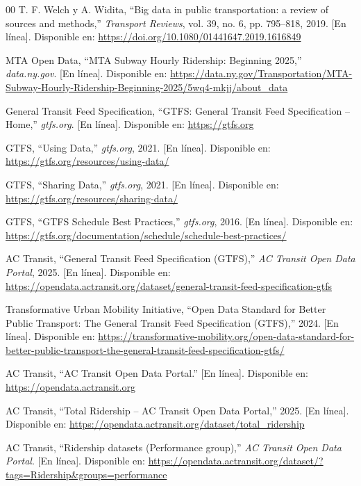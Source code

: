 \documentclass[preprint,12pt]{elsarticle}
\begin{document}
\begin{thebibliography}{00}
T. F. Welch y A. Widita, ``Big data in public transportation: a review of sources and methods,'' \textit{Transport Reviews}, vol. 39, no. 6, pp. 795--818, 2019. [En línea]. Disponible en: \url{https://doi.org/10.1080/01441647.2019.1616849}

MTA Open Data, ``MTA Subway Hourly Ridership: Beginning 2025,'' \textit{data.ny.gov}. [En línea]. Disponible en: \url{https://data.ny.gov/Transportation/MTA-Subway-Hourly-Ridership-Beginning-2025/5wq4-mkjj/about_data}

General Transit Feed Specification, ``GTFS: General Transit Feed Specification -- Home,'' \textit{gtfs.org}. [En línea]. Disponible en: \url{https://gtfs.org}

GTFS, ``Using Data,'' \textit{gtfs.org}, 2021. [En línea]. Disponible en: \url{https://gtfs.org/resources/using-data/}

GTFS, ``Sharing Data,'' \textit{gtfs.org}, 2021. [En línea]. Disponible en: \url{https://gtfs.org/resources/sharing-data/}

GTFS, ``GTFS Schedule Best Practices,'' \textit{gtfs.org}, 2016. [En línea]. Disponible en: \url{https://gtfs.org/documentation/schedule/schedule-best-practices/}

AC Transit, ``General Transit Feed Specification (GTFS),'' \textit{AC Transit Open Data Portal}, 2025. [En línea]. Disponible en: \url{https://opendata.actransit.org/dataset/general-transit-feed-specification-gtfs}

Transformative Urban Mobility Initiative, ``Open Data Standard for Better Public Transport: The General Transit Feed Specification (GTFS),'' 2024. [En línea]. Disponible en: \url{https://transformative-mobility.org/open-data-standard-for-better-public-transport-the-general-transit-feed-specification-gtfs/}

AC Transit, ``AC Transit Open Data Portal.'' [En línea]. Disponible en: \url{https://opendata.actransit.org}

AC Transit, ``Total Ridership -- AC Transit Open Data Portal,'' 2025. [En línea]. Disponible en: \url{https://opendata.actransit.org/dataset/total_ridership}

AC Transit, ``Ridership datasets (Performance group),'' \textit{AC Transit Open Data Portal}. [En línea]. Disponible en: \url{https://opendata.actransit.org/dataset/?tags=Ridership&groups=performance}


\end{thebibliography}
\end{document}

